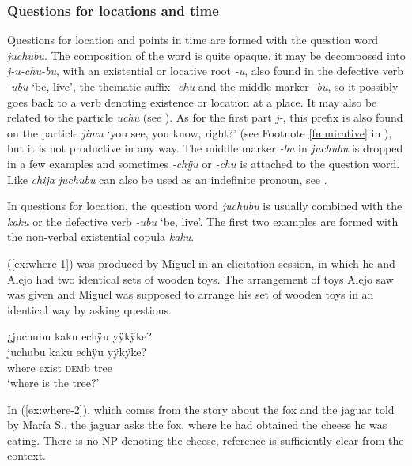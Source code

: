 \subsubsection{Questions for locations and time}\label{sec:Q_juchubu}

Questions for location and points in time are formed with the question word \textit{juchubu}. The composition of the word is quite opaque, it may be decomposed into \textit{j-u-chu-bu}, with an existential or locative root \textit{-u}, also found in the defective verb \textit{-ubu} ‘be, live’, the thematic suffix \textit{-chu} and the middle marker \textit{-bu}, so it possibly goes back to a verb denoting existence or location at a place. It may also be related to the  particle \textit{uchu} (see ).  As for the first part \textit{j-}, this prefix is also found on the  particle \textit{jimu} ‘you see, you know, right?’ (see Footnote \ref{fn:mirative} in ), but it is not productive in any way. The middle marker \textit{-bu} in \textit{juchubu} is dropped in a few examples and sometimes \textit{-chÿu} or \textit{-chu} is attached to the question word. Like \textit{chija} \textit{juchubu} can also be used as an indefinite pronoun, see .

In questions for location, the question word \textit{juchubu} is usually combined with the  \textit{kaku} or the defective verb \textit{-ubu} ‘be, live’.  The first two examples are formed with the non-verbal existential copula \textit{kaku}.

(\ref{ex:where-1}) was produced by Miguel in an elicitation session, in which he and Alejo had two identical sets of wooden toys. The arrangement of toys Alejo saw was given and Miguel was supposed to arrange his set of wooden toys in an identical way by asking questions.

\newpage
\ea\label{ex:where-1}
\begingl
\glpreamble ¿juchubu kaku echÿu yÿkÿke?\\
\gla juchubu kaku echÿu yÿkÿke?\\
\glb where exist \textsc{dem}b tree\\
\glft ‘where is the tree?’
\endgl
\trailingcitation{[mtx-e110915ls.19]}
\xe

In (\ref{ex:where-2}), which comes from the story about the fox and the jaguar told by María S., the jaguar asks the fox, where he had obtained the cheese he was eating. There is no NP denoting the cheese, reference is sufficiently clear from the context.

